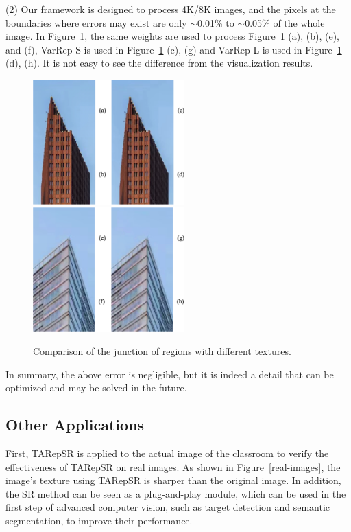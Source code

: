 \documentclass[sn-mathphys]{sn-jnl}%
\theoremstyle{thmstyleone}%
\theoremstyle{thmstyletwo}%
\theoremstyle{thmstylethree}%
\begin{document}
(2) Our framework is designed to process 4K/8K images, and the pixels at the boundaries where errors may exist are only $\sim$0.01\% to $\sim$0.05\% of the whole image. In Figure~\ref{junction}, the same weights are used to process Figure~\ref{junction} (a), (b), (e), and (f), VarRep-S is used in Figure~\ref{junction} (c), (g) and VarRep-L is used in Figure~\ref{junction} (d), (h). It is not easy to see the difference from the visualization results.

\begin{figure}
    \centering
    \includegraphics[width=2.3in]{1339_cons.png}
    \includegraphics[width=2.3in]{1339_cons2.png}
    \caption{Comparison of the junction of regions with different textures.}
    \label{junction}
\end{figure}

In summary, the above error is negligible, but it is indeed a detail that can be optimized and may be solved in the future.


\subsection{Other Applications}
First, TARepSR is applied to the actual image of the classroom to verify the effectiveness of TARepSR on real images. As shown in Figure~\ref{real-images}, the image's texture using TARepSR is sharper than the original image. In addition, the SR method can be seen as a plug-and-play module, which can be used in the first step of advanced computer vision, such as target detection and semantic segmentation, to improve their performance.
\end{document}
